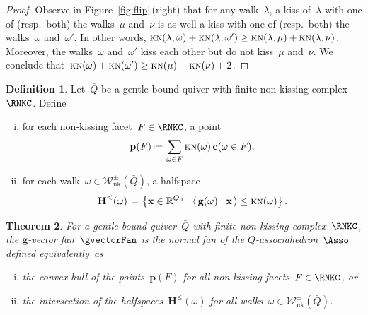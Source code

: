 \documentclass{amsart}
\newtheorem{theorem}{Theorem}[part]
\theoremstyle{definition}
\newtheorem{definition}[theorem]{Definition}
\newcommand{\R}{\mathbb{R}} %
\renewcommand{\b}[1]{\mathbf{#1}} %
\newcommand{\set}[2]{\left\{ #1 \;\middle|\; #2 \right\}} %
\newcommand{\dotprod}[2]{\left\langle \, #1 \; \middle| \; #2 \, \right\rangle} %
\newcommand{\eqdef}{\mbox{\,\raisebox{0.2ex}{\scriptsize\ensuremath{\mathrm:}}\ensuremath{=}\,}} %
\newcommand{\fref}[1]{Figure~\ref{#1}} %
\newcommand{\darkblue}{\color{darkblue}} %
\newcommand{\defn}[1]{\textsl{\darkblue #1}} %
\newcommand{\NKWalks}{\mathcal{W}_\mathrm{nk}} %
\newcommand{\KN}{\textsc{kn}} %
\newcommand{\gvector}[1]{\mathbf{g}(#1)} %
\newcommand{\cvector}[2]{\mathbf{c}(#1 \in #2)} %
\newcommand{\point}[1]{\mathbf{p}(#1)} %
\newcommand{\HS}[1]{\mathbf{H}^{\le}(#1)} %
\begin{document}
\begin{proof}
Observe in \fref{fig:flip}\,(right) that for any walk~$\lambda$, a kiss of~$\lambda$ with one of (resp.~both) the walks~$\mu$ and~$\nu$ is as well a kiss with one of (resp.~both) the walks~$\omega$ and~$\omega'$.
In other words, $\KN(\lambda, \omega) + \KN(\lambda, \omega') \ge \KN(\lambda, \mu) + \KN(\lambda, \nu)$.
Moreover, the walks~$\omega$ and~$\omega'$ kiss each other but do not kiss~$\mu$ and~$\nu$.
We conclude that~$\KN(\omega) + \KN(\omega') \ge \KN(\mu) + \KN(\nu) + 2$.
\end{proof}

\begin{definition}
Let~$\bar Q$ be a gentle bound quiver with finite non-kissing complex~$\RNKC$.
Define
\begin{enumerate}[(i)]
\item for each non-kissing facet~${F \in \RNKC}$, a point
\[
\point{F} \eqdef \sum_{\omega \in F} \KN(\omega) \, \cvector{\omega}{F},
\]
\item for each walk~${\omega \in \NKWalks^\pm(\bar Q)}$, a halfspace
\[
\HS{\omega} \eqdef \set{\b{x} \in \R^{Q_0}}{\dotprod{\gvector{\omega}}{\b{x}} \le \KN(\omega)}.
\]
\end{enumerate}
\end{definition}

\begin{theorem}
\label{thm:associahedron}
For a gentle bound quiver~$\bar Q$ with finite non-kissing complex~$\RNKC$, the $\b{g}$-vector fan~$\gvectorFan$ is the normal fan of the \defn{$\bar Q$-associahedron}~$\Asso$ defined equivalently~as
\begin{enumerate}[(i)]
\item the convex hull of the points~$\point{F}$ for all non-kissing facets~${F \in \RNKC}$, or
\item the intersection of the halfspaces~$\HS{\omega}$ for all walks~${\omega \in \NKWalks^\pm(\bar Q)}$.
\end{enumerate}
\end{theorem}
\end{document}
